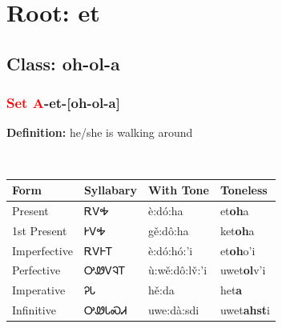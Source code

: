 \needspace{4in}
\section*{Root: et}
\nopagebreak
{}
\needspace{3in}
\subsection*{Class: oh-ol-a}
\nopagebreak
\needspace{2in}
\subsubsection*{\textcolor{Red}{Set A}{-}\textbf{et}{-}[oh-ol-a]}
\nopagebreak
\textbf{Definition: } he/she is walking around
\\[0.5em]
\begin{tabularx}{\textwidth}{l X X X}%
\toprule%
\textbf{Form}&\textbf{Syllabary}&\textbf{With Tone}&\textbf{Toneless}\\%
\midrule%
Present&ᎡᏙᎭ&è:dó:ha&et\textbf{oh}a\\%
1st Present&ᎨᏙᎭ&gě:dô:ha&ket\textbf{oh}a\\%
Imperfective&ᎡᏙᎰᎢ&è:dó:hó:’i&et\textbf{oh}o'i\\%
Perfective&ᎤᏪᏙᎸᎢ&ù:wě:dô:lv̌:’i&uwet\textbf{ol}v'i\\%
Imperative&ᎮᏓ&hě:da&het\textbf{a}\\%
Infinitive&ᎤᏪᏓᏍᏗ&uwe:dà:sdi&uwet\textbf{ahst}i\\%
\bottomrule%
\end{tabularx}
\\[1em]